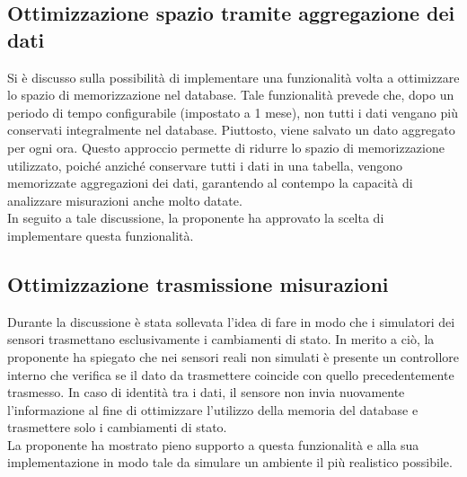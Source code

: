\documentclass{article}
\begin{document}
    \subsection{Ottimizzazione spazio tramite aggregazione dei dati}
        Si è discusso sulla possibilità di implementare una funzionalità volta a ottimizzare lo spazio di memorizzazione nel database. Tale funzionalità prevede che, dopo un periodo di tempo configurabile (impostato a 1 mese), non tutti i dati vengano più conservati integralmente nel database. Piuttosto, viene salvato un dato aggregato per ogni ora. Questo approccio permette di ridurre lo spazio di memorizzazione utilizzato, poiché anziché conservare tutti i dati in una tabella, vengono memorizzate aggregazioni dei dati, garantendo al contempo la capacità di analizzare misurazioni anche molto datate. \\
        In seguito a tale discussione, la proponente ha approvato la scelta di implementare questa funzionalità.

    \subsection{Ottimizzazione trasmissione misurazioni}
        Durante la discussione è stata sollevata l'idea di fare in modo che i simulatori dei sensori trasmettano esclusivamente i cambiamenti di stato. In merito a ciò, la proponente ha spiegato che nei sensori reali non simulati è presente un controllore interno che verifica se il dato da trasmettere coincide con quello precedentemente trasmesso. In caso di identità tra i dati, il sensore non invia nuovamente l'informazione al fine di ottimizzare l'utilizzo della memoria del database e trasmettere solo i cambiamenti di stato. \\
        La proponente ha mostrato pieno supporto a questa funzionalità e alla sua implementazione in modo tale da simulare un ambiente il più realistico possibile.
\end{document}
